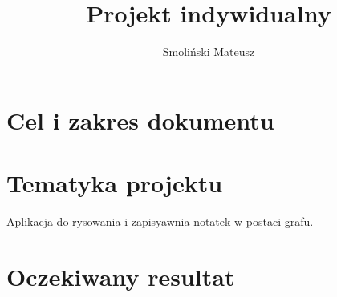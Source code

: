 \documentclass[a4paper,11pt]{article}
\title{Projekt indywidualny}
\author{Smoliński Mateusz}
\date{ }
\begin{document}
\maketitle
\tableofcontents
\thispagestyle{empty}
\newpage

\section{Cel i zakres dokumentu}

\section{Tematyka projektu}
Aplikacja do rysowania i zapisyawnia notatek w postaci grafu.

\section{Oczekiwany resultat}
\end{document}
